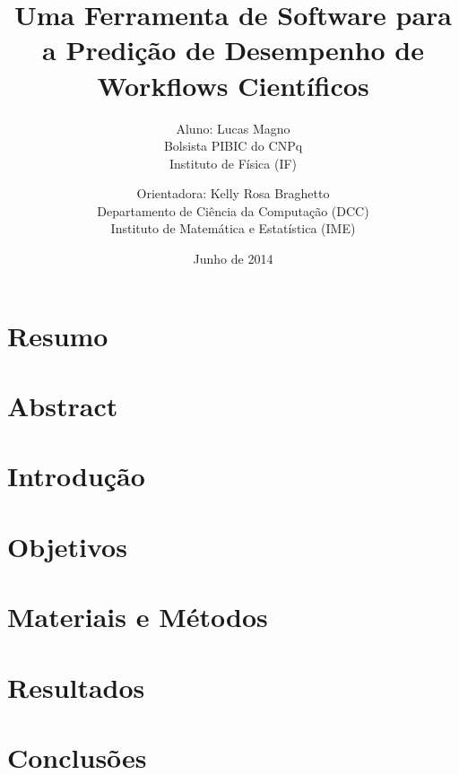\documentclass[a4paper,11pt]{article}
\date{Junho de 2014}
\title{
	Uma Ferramenta de Software para a Predição de Desempenho de Workflows Científicos
}
\author{
  Aluno: Lucas Magno \\
	Bolsista PIBIC do CNPq \\
	Instituto de Física (IF) \\
	\and
    Orientadora: Kelly Rosa Braghetto\\
	Departamento de Ciência da Computação (DCC) \\
	Instituto de Matemática e Estatística (IME) \\
}
\begin{document}
  \maketitle
  \section{Resumo}

  \section{Abstract}

  \newpage
  \section{Introdução}
  \section{Objetivos}
  \section{Materiais e Métodos}
  \section{Resultados}
  \section{Conclusões}


  
  
\end{document}
